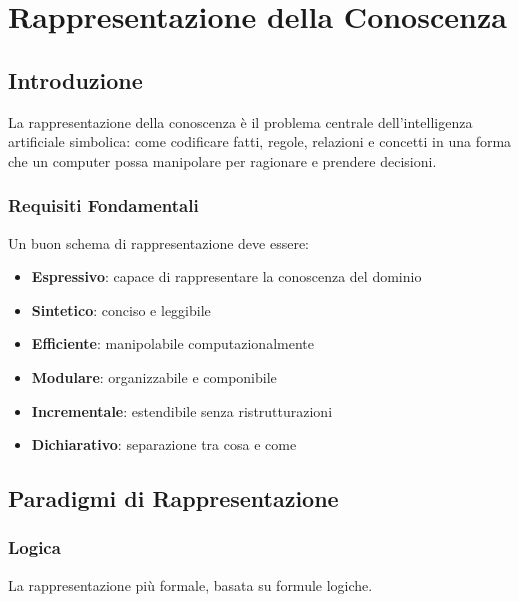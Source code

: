 
\chapter{Rappresentazione della Conoscenza}
\label{cap:rappresentazione_conoscenza}

\section{Introduzione}

La rappresentazione della conoscenza è il problema centrale dell'intelligenza artificiale simbolica: come codificare fatti, regole, relazioni e concetti in una forma che un computer possa manipolare per ragionare e prendere decisioni.

\subsection{Requisiti Fondamentali}

Un buon schema di rappresentazione deve essere:

\begin{infobox}
\begin{itemize}
\item \textbf{Espressivo}: capace di rappresentare la conoscenza del dominio
\item \textbf{Sintetico}: conciso e leggibile
\item \textbf{Efficiente}: manipolabile computazionalmente
\item \textbf{Modulare}: organizzabile e componibile
\item \textbf{Incrementale}: estendibile senza ristrutturazioni
\item \textbf{Dichiarativo}: separazione tra cosa e come
\end{itemize}
\end{infobox}

\section{Paradigmi di Rappresentazione}

\subsection{Logica}

La rappresentazione più formale, basata su formule logiche.

